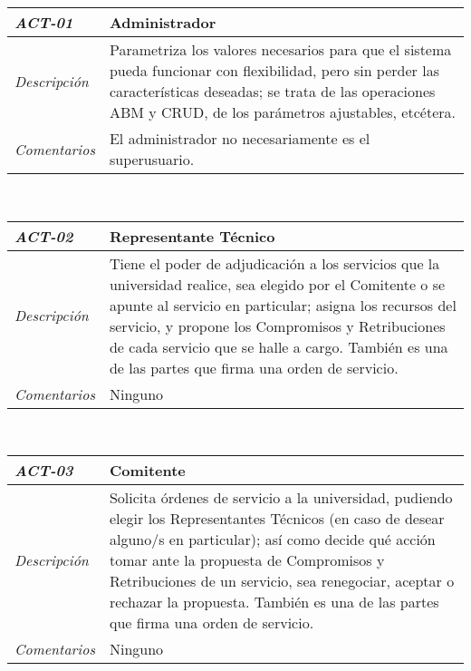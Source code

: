\begin{center}
\begin{tabular}{ | p{3cm} | p{12.5cm} | }
	\hline
	\rowcolor{lightgray}
	\hfil \textbf{\textit{ACT-01}} &
	\hfil \textbf{Administrador} \\
	\hline
	\raggedleft \textit{Descripci\'on} &
	Parametriza los valores necesarios para que
	el sistema pueda funcionar con flexibilidad,
	pero sin perder las caracter\'isticas deseadas;
	se trata de las operaciones ABM y CRUD, de los
	par\'ametros ajustables, etc\'etera. \\
	\hline
	\raggedleft \textit{Comentarios} & El administrador
	no necesariamente es el superusuario. \\
	\hline
\end{tabular} \\[1cm]
\begin{tabular}{ | p{3cm} | p{12.5cm} | }
	\hline
	\rowcolor{lightgray}
	\hfil \textbf{\textit{ACT-02}} &
	\hfil \textbf{Representante T\'ecnico} \\
	\hline
	\raggedleft \textit{Descripci\'on} &
	Tiene el poder de adjudicaci\'on a los servicios
	que la universidad realice, sea elegido por
	el Comitente o se apunte al servicio en
	particular; asigna los recursos del servicio,
	y propone los Compromisos y Retribuciones
	de cada servicio que se halle a cargo. Tambi\'en
	es una de las partes que firma una orden de
	servicio. \\
	\hline
	\raggedleft \textit{Comentarios} & Ninguno \\
	\hline
\end{tabular} \\[1cm]
\begin{tabular}{ | p{3cm} | p{12.5cm} | }
	\hline
	\rowcolor{lightgray}
	\hfil \textbf{\textit{ACT-03}} &
	\hfil \textbf{Comitente} \\
	\hline
	\raggedleft \textit{Descripci\'on} &
	Solicita \'ordenes de servicio a la universidad,
	pudiendo elegir los Representantes T\'ecnicos
	(en caso de desear alguno/s en particular); as\'i
	como decide qu\'e acci\'on tomar ante la propuesta
	de Compromisos y Retribuciones de un servicio, sea
	renegociar, aceptar o rechazar la propuesta.
	Tambi\'en es una de las partes que firma una orden
	de servicio. \\
	\hline
	\raggedleft \textit{Comentarios} & Ninguno \\
	\hline
\end{tabular} \\[1cm]
\begin{tabular}{ | p{3cm} | p{12.5cm} | }

\end{tabular}
\end{center}
